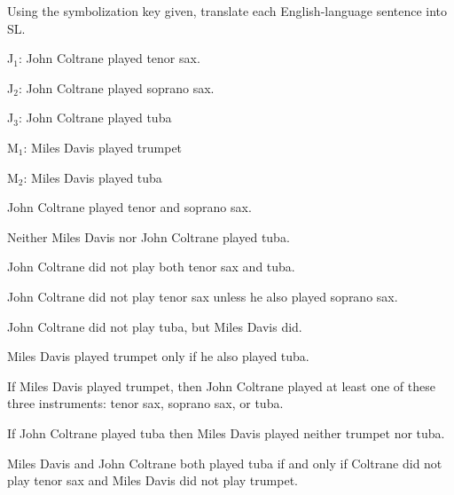 
\problempart Using the symbolization key given, translate each English-language sentence into SL.
\label{pr.jazzinstruments}
\begin{ekey}
\item[J$_1$:] John Coltrane played tenor sax.
\item[J$_2$:] John Coltrane played soprano sax.
\item[J$_3$:] John Coltrane played tuba
\item[M$_1$:] Miles Davis played trumpet
\item[M$_2$:]Miles Davis played tuba
\end{ekey}

\begin{earg}
\item John Coltrane played tenor and soprano sax. %
\item Neither Miles Davis nor John Coltrane played tuba. %
\item John Coltrane did not play both tenor sax and tuba.  %
\item John Coltrane did not play tenor sax unless he also played soprano sax. %
\item John Coltrane did not play tuba, but Miles Davis did. %
\item Miles Davis played trumpet only if he also played tuba. %
\item If Miles Davis played trumpet, then John Coltrane played at least one of these three instruments: tenor sax, soprano sax, or tuba. %
\item If John Coltrane played tuba then Miles Davis played neither trumpet nor tuba. %
\item Miles Davis and John Coltrane both played tuba if and only if Coltrane did not play tenor sax and Miles Davis did not play trumpet. %
\end{earg}


